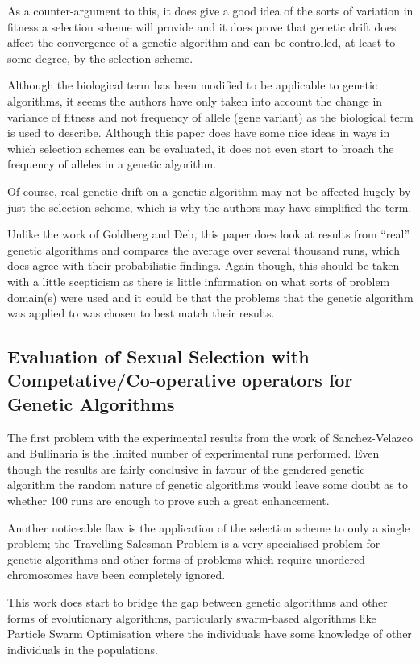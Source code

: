 \documentclass[10pt, a4paper]{article}
\begin{document}
As a counter-argument to this, it does give a good idea of the sorts of
variation in fitness a selection scheme will provide and it does prove that
genetic drift does affect the convergence of a genetic algorithm and can be
controlled, at least to some degree, by the selection scheme.

Although the biological term has been modified to be applicable to genetic
algorithms, it seems the authors have only taken into account the change in
variance of fitness and not frequency of allele (gene variant) as the 
biological term is used to describe. Although this paper does have some nice
ideas in ways in which selection schemes can be evaluated, it does not even
start to broach the frequency of alleles in a genetic algorithm.

Of course, real genetic drift on a genetic algorithm may not be affected hugely
by just the selection scheme, which is why the authors may have simplified the
term.

Unlike the work of Goldberg and Deb, this paper does look at results from
``real'' genetic algorithms and compares the average over several thousand 
runs, which does agree with their probabilistic findings. Again though, this
should be taken with a little scepticism as there is little information on what
sorts of problem domain(s) were used and it could be that the problems that the
genetic algorithm was applied to was chosen to best match their results.


\subsection{Evaluation of Sexual Selection with Competative/Co-operative operators for Genetic Algorithms}
The first problem with the experimental results from the work of 
Sanchez-Velazco and Bullinaria\cite{SanchezVelazco2003Sexual} is the limited
number of experimental runs performed. Even though the results are fairly
conclusive in favour of the gendered genetic algorithm the random nature of
genetic algorithms would leave some doubt as to whether 100 runs are enough to
prove such a great enhancement.

Another noticeable flaw is the application of the selection scheme to only a
single problem; the Travelling Salesman Problem is a very specialised problem
for genetic algorithms and other forms of problems which require unordered
chromosomes have been completely ignored.

This work does start to bridge the gap between genetic algorithms and other
forms of evolutionary algorithms, particularly swarm-based algorithms like
Particle Swarm Optimisation where the individuals have some knowledge of other
individuals in the populations.
\end{document}
